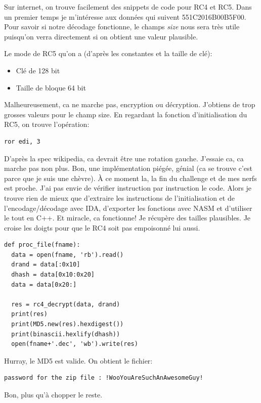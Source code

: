 \documentclass[14pt]{article}
\begin{document}
Sur internet, on trouve facilement des snippets de code pour RC4 et RC5.
Dans un premier temps je m'intéresse aux données qui suivent 551C2016B00B5F00. Pour savoir si notre décodage fonctionne, le champs {\em size} nous sera très utile puisqu'on verra directement si on obtient une valeur plausible.

Le mode de RC5 qu'on a (d'après les constantes et la taille de clé):
\begin{itemize}
\item Clé de 128 bit
\item Taille de bloque 64 bit
\end{itemize}

Malheureusement, ca ne marche pas, encryption ou décryption. J'obtiens de trop grosses valeurs pour le champ size.
En regardant la fonction d'initialisation du RC5, on trouve l'opération:
\begin{verbatim}
ror edi, 3
\end{verbatim}
D'après la spec wikipedia, ca devrait être une rotation gauche.
J'essaie ca, ca marche pas non plus. Bon, une implémentation piégée, génial (ca se trouve c'est parce que je suis une chèvre).
À ce moment la, la fin du challenge et de mes nerfs est proche. J'ai pas envie de vérifier instruction par instruction le code. Alors je trouve rien de mieux que d'extraire les instructions de l'initialisation et de l'encodage/décodage avec IDA, d'exporter les fonctions avec NASM et d'utiliser le tout en C++. Et miracle, ca fonctionne!
Je récupère des tailles plausibles. Je croise les doigts pour que le RC4 soit pas empoisonné lui aussi.

\begin{verbatim}
def proc_file(fname):
  data = open(fname, 'rb').read()
  drand = data[:0x10]
  dhash = data[0x10:0x20]
  data = data[0x20:]

  res = rc4_decrypt(data, drand)
  print(res)
  print(MD5.new(res).hexdigest())
  print(binascii.hexlify(dhash))
  open(fname+'.dec', 'wb').write(res)
\end{verbatim}

Hurray, le MD5 est valide.
On obtient le fichier:
\begin{verbatim}
password for the zip file : !WooYouAreSuchAnAwesomeGuy!
\end{verbatim}

Bon, plus qu'à chopper le reste.
\end{document}

